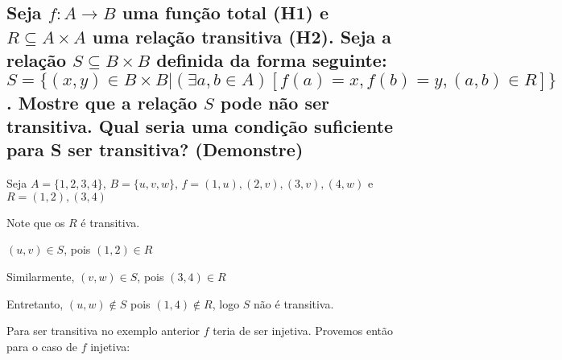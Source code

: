 \noindent
\subsection*{
	Seja 
	$ f \colon A \to B $ uma função total (H1) e $ R \subseteq A \times A $ uma relação transitiva (H2). Seja a relação $ S \subseteq B \times B $ definida da forma seguinte:	
	$ S = \{ (x,y) \in B \times B | (\exists a,b \in A)[f(a)=x, f(b)=y, (a,b) \in R ] \} $.
	Mostre que a relação $ S $ pode não ser transitiva.
	Qual seria uma condição suficiente para S ser transitiva? (Demonstre)
}


Seja $ A = \{ 1, 2, 3, 4 \} $, $ B = \{ u, v, w \} $, $ f = { (1,u), (2,v), (3,v), (4,w)} $ e $ R = {(1,2), (3,4)} $

Note que os $ R $ é transitiva.

$ (u,v) \in S $, pois $ (1,2) \in R $

Similarmente, $ (v,w) \in S $, pois $ (3,4) \in R $

Entretanto, $ (u,w) \notin S $ pois $(1,4) \notin R $, logo $ S $ não é transitiva.

Para ser transitiva no exemplo anterior $ f $ teria de ser injetiva. Provemos então para o caso de $ f $ injetiva: 

